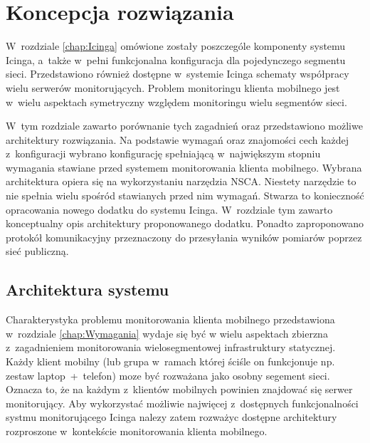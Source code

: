 \chapter{Koncepcja rozwiązania}
\label{chap:ProjektSystemu}

W~rozdziale \ref{chap:Icinga} omówione zostały poszczególe komponenty
systemu Icinga, a~także w~pełni funkcjonalna konfiguracja dla
pojedynczego segmentu sieci. Przedstawiono również dostępne w~systemie
Icinga schematy współpracy wielu serwerów monitorujących. Problem
monitoringu klienta mobilnego jest w~wielu aspektach symetryczny
względem monitoringu wielu segmentów sieci.

W~tym rozdziale zawarto porównanie tych zagadnień oraz przedstawiono
możliwe architektury rozwiązania. Na podstawie wymagań oraz znajomości
cech każdej z~konfiguracji wybrano konfigurację spełniającą
w~największym stopniu wymagania stawiane przed systemem monitorowania
klienta mobilnego. Wybrana architektura opiera się na wykorzystaniu
narzędzia NSCA. Niestety narzędzie to nie spełnia wielu spośród
stawianych przed nim wymagań. Stwarza to konieczność opracowania
nowego dodatku do systemu Icinga. W~rozdziale tym zawarto konceptualny
opis architektury proponowanego dodatku. Ponadto zaproponowano
protokół komunikacyjny przeznaczony do przesyłania wyników pomiarów
poprzez sieć publiczną.

\section[Architektura systemu][Architektura systemu]{Architektura
  systemu}

Charakterystyka problemu monitorowania klienta mobilnego przedstawiona
w~rozdziale \ref{chap:Wymagania} wydaje się być w wielu aspektach
zbierzna z~zagadnieniem monitorowania wielosegmentowej infrastruktury
statycznej. Każdy klient mobilny (lub grupa w~ramach której ściśle on
funkcjonuje np. zestaw laptop~+~telefon) moze być rozważana jako
osobny segement sieci. Oznacza to, że na każdym z~klientów mobilnych
powinien znajdować się serwer monitorujący. Aby wykorzystać możliwie
najwięcej z~dostępnych funkcjonalności systmu monitorującego Icinga
nalezy zatem rozważyc dostępne architektury rozproszone w~kontekście
monitorowania klienta mobilnego.

